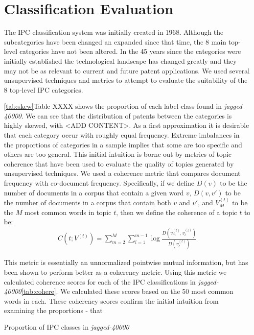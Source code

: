 \section{Classification Evaluation} %
\label{sec:classification_evaluation}

The IPC classification system was initially created in 1968. Although the subcategories have been changed an expanded since that time, the 8 main top-level categories have not been altered. In the 45 years since the categories were initially established the technological landscape has changed greatly and they may not be as relevant to current and future patent applications. We used several unsupervised techniques and metrics to attempt to evaluate the suitability of the 8 top-level IPC categories.

\ref{tab:skew}Table XXXX shows the proportion of each label class found in \emph{jagged-40000}. We can see that the distribution of patents between the categories is highly skewed, with <ADD CONTENT>. As a first approximation it is desirable that each category occur with roughly equal frequency. Extreme imbalances in the proportions of categories in a sample implies that some are too specific and others are too general. This initial intuition is borne out by metrics of topic coherence that have been used to evaluate the quality of topics generated by unsupervised techniques. We used a coherence metric that compares document frequency with co-document frequency\cite{Mimno_optimizingsemantic}. Specifically, if we define $D(v)$ to be the number of documents in a corpus that contain a given word $v$, $D(v, v')$ to be the number of documents in a corpus that contain both $v$ and $v'$, and $V^{(t)}_M$ to be the $M$ most common words in topic $t$, then we define the coherence of a topic $t$ to be:
\begin{align*}
	C(t;V^{(t)}) = \sum_{m=2}^M \sum_{l=1}^{m-1} \log \frac{D(v^{(t)}_m, v^{(t)}_l)}{D(v^{(t)}_l)}
\end{align*}

This metric is essentially an unnormalized pointwise mutual information, but has been shown to perform better as a coherency metric\cite{Mimno_optimizingsemantic}. Using this metric we calculated coherence scores for each of the IPC classifications in \emph{jagged-40000}\ref{tab:cohere}. We calculated these scores based on the 50 most common words in each. These coherency scores confirm the initial intuition from examining the proportions - that 

\begin{tablehere}
	\label{tab:skew}
	\centering
	\caption{Proportion of IPC classes in \emph{jagged-40000}}
\end{tablehere}

